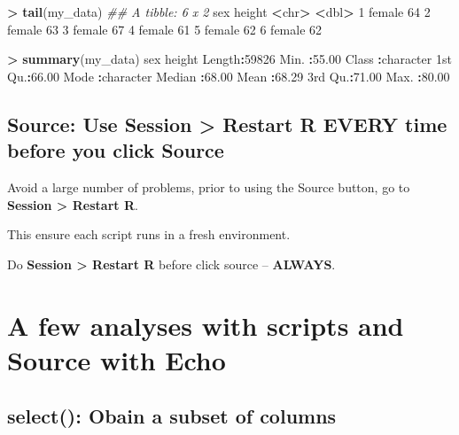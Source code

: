 \documentclass[
]{krantz}
\makeatletter
\newenvironment{Shaded}{\begin{snugshade}}{\end{snugshade}}
\newcommand{\CommentTok}[1]{\textcolor[rgb]{0.37,0.37,0.37}{\textit{#1}}}
\newcommand{\DecValTok}[1]{\textcolor[rgb]{0.06,0.06,0.06}{#1}}
\newcommand{\ErrorTok}[1]{\textcolor[rgb]{0.14,0.14,0.14}{\textbf{#1}}}
\newcommand{\FloatTok}[1]{\textcolor[rgb]{0.06,0.06,0.06}{#1}}
\newcommand{\KeywordTok}[1]{\textcolor[rgb]{0.27,0.27,0.27}{\textbf{#1}}}
\newcommand{\NormalTok}[1]{#1}
\newcommand{\OperatorTok}[1]{\textcolor[rgb]{0.43,0.43,0.43}{\textbf{#1}}}
\newcommand{\StringTok}[1]{\textcolor[rgb]{0.5,0.5,0.5}{#1}}
\newenvironment{kframe}{%
\medskip{}
\setlength{\fboxsep}{.8em}
 \def\at@end@of@kframe{}%
 \ifinner\ifhmode%
  \def\at@end@of@kframe{\end{minipage}}%
  \begin{minipage}{\columnwidth}%
 \fi\fi%
 \def\FrameCommand##1{\hskip\@totalleftmargin \hskip-\fboxsep
 \colorbox{shadecolor}{##1}\hskip-\fboxsep
     \hskip-\linewidth \hskip-\@totalleftmargin \hskip\columnwidth}%
 \MakeFramed {\advance\hsize-\width
   \@totalleftmargin\z@ \linewidth\hsize
   \@setminipage}}%
 {\par\unskip\endMakeFramed%
 \at@end@of@kframe}
\renewenvironment{Shaded}{\begin{kframe}}{\end{kframe}}
\makeatother
\begin{document}
\begin{Shaded}
\begin{Highlighting}[]
\OperatorTok{>}\StringTok{ }\KeywordTok{tail}\NormalTok{(my_data)}
\CommentTok{## A tibble: 6 x 2}
\NormalTok{  sex    height}
  \OperatorTok{<}\NormalTok{chr}\OperatorTok{>}\StringTok{   }\ErrorTok{<}\NormalTok{dbl}\OperatorTok{>}
\DecValTok{1}\NormalTok{ female     }\DecValTok{64}
\DecValTok{2}\NormalTok{ female     }\DecValTok{63}
\DecValTok{3}\NormalTok{ female     }\DecValTok{67}
\DecValTok{4}\NormalTok{ female     }\DecValTok{61}
\DecValTok{5}\NormalTok{ female     }\DecValTok{62}
\DecValTok{6}\NormalTok{ female     }\DecValTok{62}

\OperatorTok{>}\StringTok{ }\KeywordTok{summary}\NormalTok{(my_data)}
\NormalTok{     sex                height     }
\NormalTok{ Length}\OperatorTok{:}\DecValTok{59826}\NormalTok{       Min.   }\OperatorTok{:}\FloatTok{55.00}  
\NormalTok{ Class }\OperatorTok{:}\NormalTok{character   1st Qu.}\OperatorTok{:}\FloatTok{66.00}  
\NormalTok{ Mode  }\OperatorTok{:}\NormalTok{character   Median }\OperatorTok{:}\FloatTok{68.00}  
\NormalTok{                    Mean   }\OperatorTok{:}\FloatTok{68.29}  
\NormalTok{                    3rd Qu.}\OperatorTok{:}\FloatTok{71.00}  
\NormalTok{                    Max.   }\OperatorTok{:}\FloatTok{80.00}  
\end{Highlighting}
\end{Shaded}

\hypertarget{source-use-session-restart-r-every-time-before-you-click-source}{%
\subsection{Source: Use Session \textgreater{} Restart R EVERY time before you click Source}\label{source-use-session-restart-r-every-time-before-you-click-source}}

Avoid a large number of problems, prior to using the Source button, go to \textbf{Session \textgreater{} Restart R}.

This ensure each script runs in a fresh environment.

Do \textbf{Session \textgreater{} Restart R} before click source -- \textbf{ALWAYS}.

\hypertarget{a-few-analyses-with-scripts-and-source-with-echo}{%
\section{A few analyses with scripts and Source with Echo}\label{a-few-analyses-with-scripts-and-source-with-echo}}

\hypertarget{select-obain-a-subset-of-columns}{%
\subsection{select(): Obain a subset of columns}\label{select-obain-a-subset-of-columns}}
\end{document}
